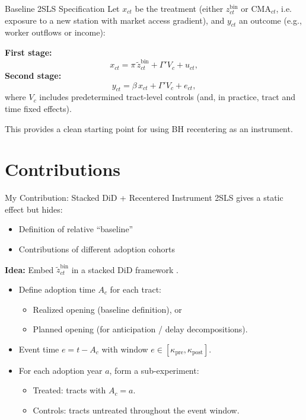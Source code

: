 \documentclass{beamer}
\begin{document}
\begin{frame}{Baseline 2SLS Specification}
\small
Let $x_{ct}$ be the treatment (either $z^{\text{bin}}_{ct}$ or $\text{CMA}_{ct}$, i.e. exposure to a new station with market access gradient), and $y_{ct}$ an outcome (e.g., worker outflows or income):

\medskip
\textbf{First stage:}
\[
x_{ct} = \pi \, \tilde{z}^{\text{bin}}_{ct} + \Gamma' V_c + u_{ct},
\]
\textbf{Second stage:}
\[
y_{ct} = \beta \, \hat{x}_{ct} + \Gamma' V_c + e_{ct},
\]
where $V_c$ includes predetermined tract-level controls (and, in practice, tract and time fixed effects).

\medskip
This provides a clean starting point for using BH recentering as an instrument.
\end{frame}

\section{Contributions}
\begin{frame}{My Contribution: Stacked DiD + Recentered Instrument}
\small
2SLS gives a static effect but hides:
\begin{itemize}
    \item Definition of relative ``baseline''
    \item Contributions of different adoption cohorts
\end{itemize}

\medskip
\textbf{Idea:} Embed $\tilde{z}^{\text{bin}}_{ct}$ in a stacked DiD framework \parencite{wing_stacked_2024}.

\begin{itemize}
    \item Define adoption time $A_c$ for each tract:
    \begin{itemize}
        \item Realized opening (baseline definition), or
        \item Planned opening (for anticipation / delay decompositions).
    \end{itemize}
    \item Event time $e = t - A_c$ with window $e \in [\kappa_{\text{pre}}, \kappa_{\text{post}}]$.
    \item For each adoption year $a$, form a sub-experiment:
    \begin{itemize}
        \item Treated: tracts with $A_c = a$.
        \item Controls: tracts untreated throughout the event window.
    \end{itemize}
\end{itemize}
\end{frame}
\end{document}
